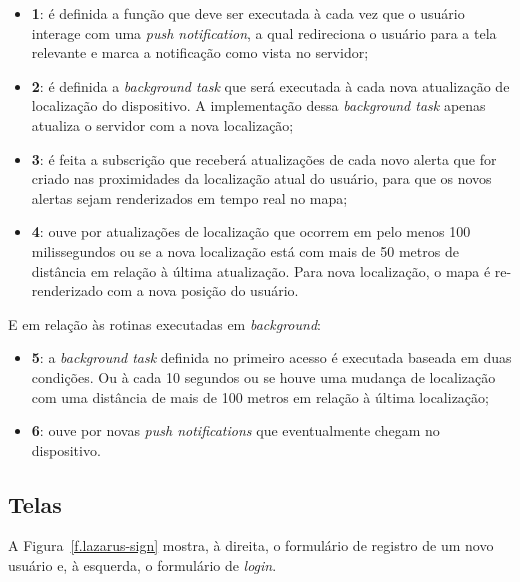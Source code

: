 \begin{itemize}
	\item \textbf{1}: é definida a função que deve ser executada à cada vez que o usuário interage com uma \emph{push notification}, a qual redireciona o usuário para a tela relevante e marca a notificação como vista no servidor;
	\item \textbf{2}: é definida a \emph{background task} que será executada à cada nova atualização de localização do dispositivo. A implementação dessa \emph{background task} apenas atualiza o servidor com a nova localização;
	\item \textbf{3}: é feita a subscrição que receberá atualizações de cada novo alerta que for criado nas proximidades da localização atual do usuário, para que os novos alertas sejam renderizados em tempo real no mapa;
	\item \textbf{4}: ouve por atualizações de localização que ocorrem em pelo menos 100 milissegundos ou se a nova localização está com mais de 50 metros de distância em relação à última atualização. Para nova localização, o mapa é re-renderizado com a nova posição do usuário.
\end{itemize}

E em relação às rotinas executadas em \emph{background}:

\begin{itemize}
	\item \textbf{5}: a \emph{background task} definida no primeiro acesso é executada baseada em duas condições. Ou à cada 10 segundos ou se houve uma mudança de localização com uma distância de mais de 100 metros em relação à última localização;
	\item \textbf{6}: ouve por novas \emph{push notifications} que eventualmente chegam no dispositivo.
\end{itemize}

\subsection{Telas}

A Figura~\ref{f.lazarus-sign} mostra, à direita, o formulário de registro de um novo usuário e, à esquerda, o formulário de \emph{login}.

